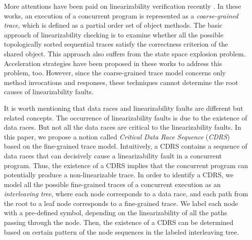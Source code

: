 \documentclass[runningheads]{llncs}
\begin{document}
More attentions have been paid on linearizability verification recently \cite{DBLP:conf/pldi/BurckhardtDMT10,DBLP:conf/popl/BouajjaniEEH15,DBLP:conf/forte/HornK15a,DBLP:conf/sac/LongZ16,DBLP:journals/concurrency/Lowe17}.     
In these works, an execution of a concurrent program is represented as a \textit{coarse-grained trace}, which is defined as a partial order set of object methods. 
The basic approach of linearizability checking is to examine whether all the possible topologically sorted sequential traces satisfy the correctness criterion of the shared object. This approach also suffers from the state space explosion problem. Acceleration strategies have been proposed in these works to address this problem, too.  
However, since the coarse-grained trace model concerns only method invocations and responses, 
these techniques cannot determine the root causes of linearizability faults.

It is worth mentioning that data races and linearizability faults are different but related concepts. 
The occurrence of linearizability faults is due to the existence of data races. But not all the data races are critical to the linearizability faults. 
In this paper, we propose a notion called \textit{Critical Data Race Sequence} (\textit{CDRS}) based on the fine-grained trace model. 
Intuitively, a CDRS contains a sequence of data races that can decisively cause a linearizability fault in a concurrent program. 
Thus, the existence of a CDRS implies that the concurrent program can potentially produce a non-linearizable trace. 
In order to identify a CDRS, we model all the possible fine-grained traces of a concurrent execution as an \textit{interleaving tree}, 
where each node corresponds to a data race, and each path from the root to a leaf node corresponds to a fine-grained trace. 
We label each node with a pre-defined symbol, depending on the linearizability of all the paths passing through the node. 
Then, the existence of a CDRS can be determined based on certain pattern of the node sequences in the labeled interleaving tree.
 
\end{document}
